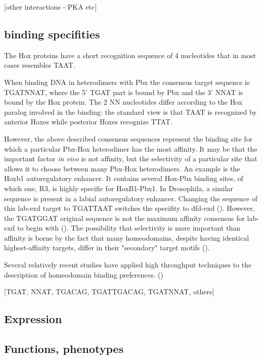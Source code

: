 		[other interactions - PKA etc]

\subsection{binding specifities}
		
		The Hox proteins have a short recognition sequence of 4 nucleotides that in most cases resembles TAAT. 
		
		When binding DNA in heterodimers with Pbx the consensus target sequence is TGATNNAT, where the 5' TGAT part is bound by Pbx and the 3' NNAT is bound by the Hox protein. The 2 NN nucleotides differ according to the Hox paralog involved in the binding: the standard view is that TAAT is recognized by anterior Hoxes while posterior Hoxes recognize TTAT.
		
		However, the above described consensus sequences represent the binding site for which a particular Pbx-Hox heterodimer has the most affinity. It may be that the important factor \textit{in vivo} is not affinity, but the selectivity of a particular site that allows it to choose between many Pbx-Hox heterodimers. An example is the Hoxb1 autoregulatory enhancer. It contains several Hox-Pbx binding sites, of which one, R3, is highly specific for HoxB1-Pbx1. In Drosophila, a similar sequence is present in a labial autoregulatory enhancer. Changing the sequence of this lab-\ac{exd} target to TGATTAAT switches the specifity to dfd-\ac{exd} (\cite{Chan1997}). However, the TGATGGAT original sequence is not the maximum affinity consensus for lab-\ac{exd} to begin with (\cite{Mann1998}). The possibility that selectivity is more important than affinity is borne by the fact that many homeodomains, despite having identical highest-affinity targets, differ in their "secondary" target motifs (\cite{Berger2008}).
		
		Several relatively recent studies have applied high throughput techniques to the description of homeodomain binding preferences. (\cite{Slattery2011,Berger2008,Noyes2008})
		
		[TGAT, NNAT, TGACAG, TGATTGACAG, TGATNNAT, others]



\subsection{Expression}
\subsection{Functions, phenotypes}

